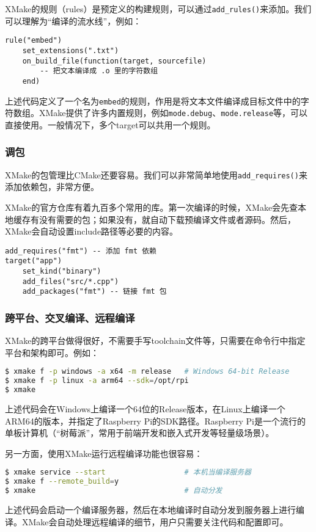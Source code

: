 \documentclass[../main.tex]{subfiles}
\begin{document}
XMake的规则（rules）是预定义的构建规则，可以通过\texttt{add\_rules()}来添加。我们可以理解为“编译的流水线”，例如：
\begin{lstlisting}
rule("embed")
    set_extensions(".txt")
    on_build_file(function(target, sourcefile)
        -- 把文本编译成 .o 里的字符数组
    end)
\end{lstlisting}
上述代码定义了一个名为\texttt{embed}的规则，作用是将文本文件编译成目标文件中的字符数组。XMake提供了许多内置规则，例如\texttt{mode.debug}、\texttt{mode.release}等，可以直接使用。一般情况下，多个target可以共用一个规则。

\subsubsection{调包}

XMake的包管理比CMake还要容易。我们可以非常简单地使用\texttt{add\_requires()}来添加依赖包，非常方便。

XMake的官方仓库有着九百多个常用的库。第一次编译的时候，XMake会先查本地缓存有没有需要的包；如果没有，就自动下载预编译文件或者源码。然后，XMake会自动设置include路径等必要的内容。

\begin{lstlisting}
add_requires("fmt") -- 添加 fmt 依赖
target("app")
    set_kind("binary")
    add_files("src/*.cpp")
    add_packages("fmt") -- 链接 fmt 包
\end{lstlisting}

\subsubsection{跨平台、交叉编译、远程编译}

XMake的跨平台做得很好，不需要手写toolchain文件等，只需要在命令行中指定平台和架构即可。例如：
\begin{lstlisting}[language=bash]
$ xmake f -p windows -a x64 -m release   # Windows 64-bit Release
$ xmake f -p linux -a arm64 --sdk=/opt/rpi
$ xmake
\end{lstlisting}
上述代码会在Windows上编译一个64位的Release版本，在Linux上编译一个ARM64的版本，并指定了Raspberry Pi的SDK路径。Raspberry Pi是一个流行的单板计算机（“树莓派”，常用于前端开发和嵌入式开发等轻量级场景）。

另一方面，使用XMake运行远程编译功能也很容易：
\begin{lstlisting}[language=bash]
$ xmake service --start                  # 本机当编译服务器
$ xmake f --remote_build=y
$ xmake                                  # 自动分发
\end{lstlisting}
上述代码会启动一个编译服务器，然后在本地编译时自动分发到服务器上进行编译。XMake会自动处理远程编译的细节，用户只需要关注代码和配置即可。
\end{document}
